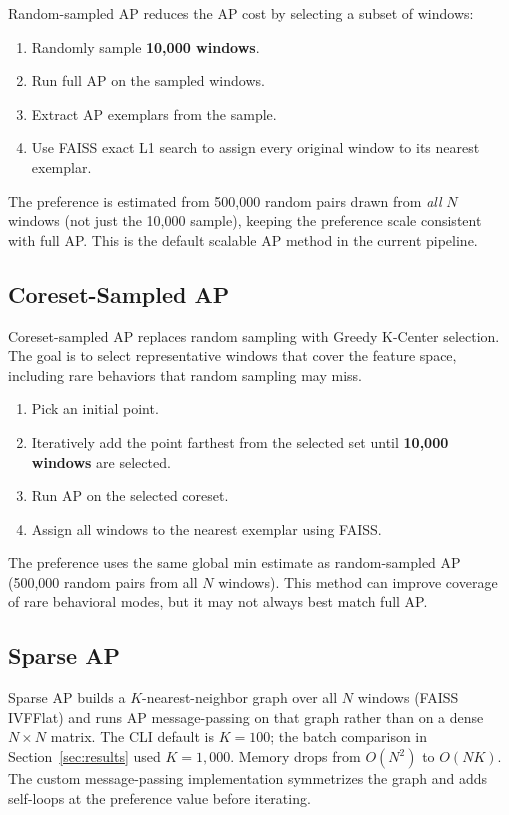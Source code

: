 \documentclass[11pt]{article}
\begin{document}
Random-sampled AP reduces the AP cost by selecting a subset of windows:

\begin{enumerate}
    \item Randomly sample \textbf{10,000 windows}.
    \item Run full AP on the sampled windows.
    \item Extract AP exemplars from the sample.
    \item Use FAISS exact L1 search to assign every original window to its nearest exemplar.
\end{enumerate}

The preference is estimated from 500,000 random pairs drawn from \emph{all} $N$ windows (not just the 10,000 sample), keeping the preference scale consistent with full AP. This is the default scalable AP method in the current pipeline.

\subsection{Coreset-Sampled AP}

Coreset-sampled AP replaces random sampling with Greedy K-Center selection. The goal is to select representative windows that cover the feature space, including rare behaviors that random sampling may miss.

\begin{enumerate}
    \item Pick an initial point.
    \item Iteratively add the point farthest from the selected set until \textbf{10,000 windows} are selected.
    \item Run AP on the selected coreset.
    \item Assign all windows to the nearest exemplar using FAISS.
\end{enumerate}

The preference uses the same global min estimate as random-sampled AP (500,000 random pairs from all $N$ windows). This method can improve coverage of rare behavioral modes, but it may not always best match full AP.

\subsection{Sparse AP}

Sparse AP builds a $K$-nearest-neighbor graph over all $N$ windows (FAISS IVFFlat) and runs AP message-passing on that graph rather than on a dense $N \times N$ matrix. The CLI default is $K=100$; the batch comparison in Section~\ref{sec:results} used $K=1{,}000$. Memory drops from $O(N^2)$ to $O(NK)$. The custom message-passing implementation symmetrizes the graph and adds self-loops at the preference value before iterating.
\end{document}
